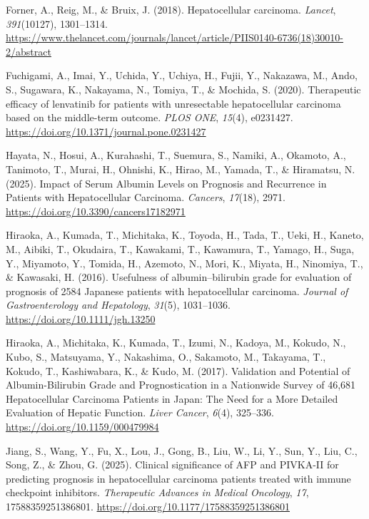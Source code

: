 \documentclass[
  indonesian,
]{report}
\newlength{\cslhangindent}
\newenvironment{CSLReferences}[2] %
 {\begin{list}{}{%
  \setlength{\itemindent}{0pt}
  \setlength{\leftmargin}{0pt}
  \setlength{\parsep}{0pt}
  \ifodd #1
   \setlength{\leftmargin}{\cslhangindent}
   \setlength{\itemindent}{-1\cslhangindent}
  \fi
  \setlength{\itemsep}{#2\baselineskip}}}
 {\end{list}}
\begin{document}
\begin{CSLReferences}{1}{0}
Forner, A., Reig, M., \& Bruix, J. (2018). Hepatocellular carcinoma.
\emph{Lancet}, \emph{391}(10127), 1301--1314.
\url{https://www.thelancet.com/journals/lancet/article/PIIS0140-6736(18)30010-2/abstract}

Fuchigami, A., Imai, Y., Uchida, Y., Uchiya, H., Fujii, Y., Nakazawa,
M., Ando, S., Sugawara, K., Nakayama, N., Tomiya, T., \& Mochida, S.
(2020). Therapeutic efficacy of lenvatinib for patients with
unresectable hepatocellular carcinoma based on the middle-term outcome.
\emph{PLOS ONE}, \emph{15}(4), e0231427.
\url{https://doi.org/10.1371/journal.pone.0231427}

Hayata, N., Hosui, A., Kurahashi, T., Suemura, S., Namiki, A., Okamoto,
A., Tanimoto, T., Murai, H., Ohnishi, K., Hirao, M., Yamada, T., \&
Hiramatsu, N. (2025). Impact of {Serum} {Albumin} {Levels} on
{Prognosis} and {Recurrence} in {Patients} with {Hepatocellular}
{Carcinoma}. \emph{Cancers}, \emph{17}(18), 2971.
\url{https://doi.org/10.3390/cancers17182971}

Hiraoka, A., Kumada, T., Michitaka, K., Toyoda, H., Tada, T., Ueki, H.,
Kaneto, M., Aibiki, T., Okudaira, T., Kawakami, T., Kawamura, T.,
Yamago, H., Suga, Y., Miyamoto, Y., Tomida, H., Azemoto, N., Mori, K.,
Miyata, H., Ninomiya, T., \& Kawasaki, H. (2016). Usefulness of
albumin--bilirubin grade for evaluation of prognosis of 2584 {Japanese}
patients with hepatocellular carcinoma. \emph{Journal of
Gastroenterology and Hepatology}, \emph{31}(5), 1031--1036.
\url{https://doi.org/10.1111/jgh.13250}

Hiraoka, A., Michitaka, K., Kumada, T., Izumi, N., Kadoya, M., Kokudo,
N., Kubo, S., Matsuyama, Y., Nakashima, O., Sakamoto, M., Takayama, T.,
Kokudo, T., Kashiwabara, K., \& Kudo, M. (2017). Validation and
{Potential} of {Albumin}-{Bilirubin} {Grade} and {Prognostication} in a
{Nationwide} {Survey} of 46,681 {Hepatocellular} {Carcinoma} {Patients}
in {Japan}: {The} {Need} for a {More} {Detailed} {Evaluation} of
{Hepatic} {Function}. \emph{Liver Cancer}, \emph{6}(4), 325--336.
\url{https://doi.org/10.1159/000479984}

Jiang, S., Wang, Y., Fu, X., Lou, J., Gong, B., Liu, W., Li, Y., Sun,
Y., Liu, C., Song, Z., \& Zhou, G. (2025). Clinical significance of
{AFP} and {PIVKA}-{II} for predicting prognosis in hepatocellular
carcinoma patients treated with immune checkpoint inhibitors.
\emph{Therapeutic Advances in Medical Oncology}, \emph{17},
17588359251386801. \url{https://doi.org/10.1177/17588359251386801}


\end{CSLReferences}
\end{document}
